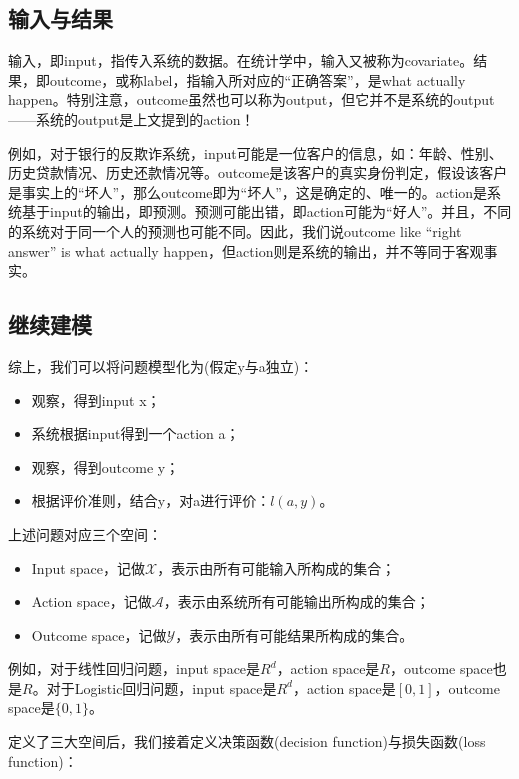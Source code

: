 \documentclass[a4paper]{article}
\begin{document}
	\subsection{输入与结果}	
		
	输入，即input，指传入系统的数据。在统计学中，输入又被称为covariate。结果，即outcome，或称label，指输入所对应的“正确答案”，是what  actually happen。特别注意，outcome虽然也可以称为output，但它并不是系统的output——系统的output是上文提到的action！
	
	例如，对于银行的反欺诈系统，input可能是一位客户的信息，如：年龄、性别、历史贷款情况、历史还款情况等。outcome是该客户的真实身份判定，假设该客户是事实上的“坏人”，那么outcome即为“坏人”，这是确定的、唯一的。action是系统基于input的输出，即预测。预测可能出错，即action可能为“好人”。并且，不同的系统对于同一个人的预测也可能不同。因此，我们说outcome like “right answer” is what actually happen，但action则是系统的输出，并不等同于客观事实。
	
	\subsection{继续建模}		
	
	综上，我们可以将问题模型化为(假定y与a独立)：

	\begin{itemize}
		\item 观察，得到input x；
		\item 系统根据input得到一个action a；
		\item 观察，得到outcome y；
		\item 根据评价准则，结合y，对a进行评价：$l(a,y)$。
	\end{itemize}

	上述问题对应三个空间：
	
	\begin{itemize}
		\item Input space，记做$\mathcal{X}$，表示由所有可能输入所构成的集合；
		\item Action space，记做$\mathcal{A}$，表示由系统所有可能输出所构成的集合；
		\item Outcome space，记做$\mathcal{Y}$，表示由所有可能结果所构成的集合。
	\end{itemize}
	
	例如，对于线性回归问题，input space是$R^d$，action space是$R$，outcome space也是$R$。对于Logistic回归问题，input space是$R^d$，action space是$[0,1]$，outcome space是$\{0,1\}$。
	
	定义了三大空间后，我们接着定义决策函数(decision function)与损失函数(loss function)：\\
	
\end{document}
